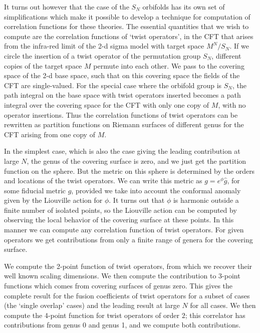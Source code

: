 \documentclass[12pt]{article}
\begin{document}
It turns out however that the
case of the $S_N$ orbifolds has its own set of
simplifications which make it possible to develop a technique for
computation of correlation functions for these theories.  The essential
quantities that we wish to compute are the correlation functions of `twist
operators',  in the  CFT that arises from the infra-red
limit of the 2-d sigma model with target space $M^N/S_N$.   If we circle the
insertion of a twist operator of the permutation group
$S_N$,  different copies of the target space
$M$ permute into each other.  We pass to the covering space of the 2-d base
space, such that on this covering space the fields  of the CFT are
single-valued.  For the special case where the orbifold group is $S_N$, the
path integral on the base space with twist operators inserted becomes a path
integral over the covering space for the CFT with only one copy of $M$, with
no operator insertions. Thus the correlation functions of twist operators can
be rewritten as partition functions on  Riemann surfaces of different genus for
the CFT arising from one copy of $M$.

In the simplest case, which is also the case giving the leading contribution at
large $N$, the genus of the covering surface is zero, and we just get the
partition function on the sphere. But the metric on this sphere is 
determined by
the orders and locations of the twist operators. We can write this metric as
$g=e^\phi \hat g$, for some fiducial metric $\hat g$, provided we take into
account the conformal anomaly given by the Liouville action for $\phi$. It
turns out that $\phi$ is harmonic outside a finite number of isolated
points, so
the Liouville action can be computed by observing the local behavior of the
covering surface at these points.  In this manner we can compute any
correlation function of twist operators.  For given operators we get
contributions from only a finite range of genera for the covering surface.

We compute the 2-point function of twist operators, from which we recover
their well known scaling dimensions.  We then compute the
contribution to  3-point functions which comes from covering surfaces of
genus zero.  This gives the complete result
for the fusion coefficients of twist operators  for a subset of cases
(the `single
overlap'  cases) and the leading result at large $N$ for all cases. We then
compute the  4-point function for twist operators of order $2$; this
correlator has contributions from genus 0 and genus 1, and we compute
both contributions.
\end{document}
